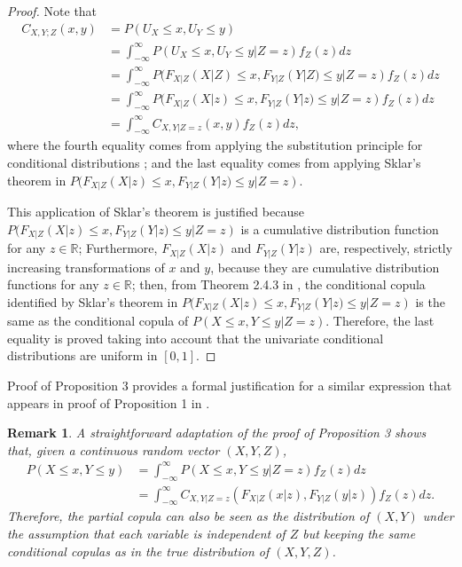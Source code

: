 \documentclass[
]{article}
\newtheorem{remark}{Remark}
\begin{document}
\begin{proof}
Note that
\begin{align*}
C_{X,Y;Z}(x, y) &= P(U_X\leq x, U_Y\leq y) \\
&= \int_{-\infty}^{\infty} P(U_X\leq x, U_Y\leq y | Z = z) f_Z(z) dz \\
&= \int_{-\infty}^{\infty} P(F_{X|Z}(X|Z) \leq x, F_{Y|Z}(Y|Z) \leq y | Z = z) f_Z(z) dz \\
&= \int_{-\infty}^{\infty} P(F_{X|Z}(X|z) \leq x, F_{Y|Z}(Y|z) \leq y | Z = z) f_Z(z) dz \\
&= \int_{-\infty}^{\infty} C_{X,Y|Z=z}(x, y) f_Z(z) dz,
\end{align*}
where the fourth equality comes from applying the substitution principle for conditional distributions \citep[Proposition 4.1 of][]{james1981}; and the last equality comes from applying Sklar's theorem \citep{sklar1959} in $P(F_{X|Z}(X|z) \leq x, F_{Y|Z}(Y|z) \leq y | Z = z)$.

This application of Sklar's theorem is justified because $P(F_{X|Z}(X|z) \leq x, F_{Y|Z}(Y|z) \leq y | Z = z)$ is a cumulative distribution function for any $z \in \mathbb{R}$; Furthermore, $F_{X|Z}(X|z)$ and $F_{Y|Z}(Y|z)$ are, respectively, strictly increasing transformations of $x$ and $y$, because they are cumulative distribution functions for any $z \in \mathbb{R}$; then, from Theorem 2.4.3 in \citep{nelsen2006}, the conditional copula identified by Sklar's theorem in $P(F_{X|Z}(X|z) \leq x, F_{Y|Z}(Y|z) \leq y | Z = z)$ is the same as the conditional copula of $P(X \leq x, Y \leq y | Z = z)$. Therefore, the last equality is proved taking into account that the univariate conditional distributions are uniform in $[0,1]$.
\end{proof}

Proof of Proposition 3 provides a formal justification for a similar
expression that appears in proof of Proposition 1 in
\citet{gijbels2015}.

\begin{remark}
A straightforward adaptation of the proof of Proposition 3 \citep[see also Equation 2.1 in][]{joe1996families} shows that, given a continuous random vector $(X,Y,Z)$,
\begin{align*}
P(X \leq x, Y \leq y) &= \int_{-\infty}^{\infty} P(X \leq x, Y \leq y | Z = z) f_Z(z) dz \\
&= \int_{-\infty}^{\infty} C_{X,Y|Z=z}(F_{X|Z}(x|z), F_{Y|Z}(y|z)) f_Z(z) dz.
\end{align*}
Therefore, the partial copula can also be seen as the distribution of $(X,Y)$ under the assumption that each variable is independent of $Z$ but keeping the same conditional copulas as in the true distribution of $(X,Y,Z)$.
\end{remark}
\end{document}
